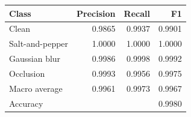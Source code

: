 \begin{tabular}{lrrr}
\toprule
Class & Precision & Recall & F1 \\
\midrule
Clean & 0.9865 & 0.9937 & 0.9901 \\
Salt-and-pepper & 1.0000 & 1.0000 & 1.0000 \\
Gaussian blur & 0.9986 & 0.9998 & 0.9992 \\
Occlusion & 0.9993 & 0.9956 & 0.9975 \\
\midrule
Macro average & 0.9961 & 0.9973 & 0.9967 \\
Accuracy & & & 0.9980 \\
\bottomrule
\end{tabular}
